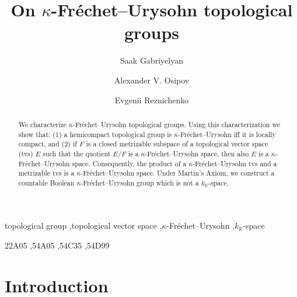 \documentclass[preprint,11pt]{elsarticle}
\theoremstyle{definition}
\theoremstyle{remark}
\numberwithin{equation}{section}
\numberwithin{theorem}{section}
\newcommand{\IR}{\mathbb{R}}
\begin{document}
\begin{frontmatter}


\title{On $\kappa$-Fr\'{e}chet--Urysohn topological groups}


\author{Saak Gabriyelyan}%
\address{Department of Mathematics, Ben-Gurion University of the Negev, Beer-Sheva, Israel}

\author{Alexander V. Osipov}%
\address{Krasovskii Institute of Mathematics and Mechanics, Ural Federal University, Yekaterinburg, Russia}


\author{Evgenii Reznichenko}%
\address{Department of Mathematics, Lomonosov Mosow State University, Moscow, Russia}


\begin{abstract}
We characterize $\kappa$-Fr\'{e}chet--Urysohn topological groups. Using this characterization we show that: (1) a hemicompact topological group is $\kappa$-Fr\'{e}chet--Urysohn iff it is locally compact, and (2) if $F$ is a closed metrizable subspace of a topological vector space (tvs) $E$ such that the quotient $E/F$ is a $\kappa$-Fr\'{e}chet--Urysohn space, then also $E$ is a $\kappa$-Fr\'{e}chet--Urysohn space. Consequently, the product of a $\kappa$-Fr\'{e}chet--Urysohn tvs and a metrizable tvs is a $\kappa$-Fr\'{e}chet--Urysohn space. Under Martin's Axiom, we construct a countable Boolean $\kappa$-Fr\'{e}chet--Urysohn group which is not a $k_\IR$-space.
\end{abstract}

\begin{keyword}
topological group \sep topological vector space \sep $\kappa$-Fr\'{e}chet--Urysohn  \sep $k_\IR$-space


\MSC[2020] 22A05 \sep 54A05  \sep   54C35 \sep 54D99

\end{keyword}

\end{frontmatter}




\section{Introduction}
\end{document}
